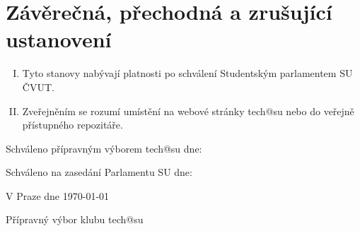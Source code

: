 \documentclass[10pt]{article}
\begin{document}
\section{Závěrečná, přechodná a zrušující ustanovení}
	\begin{enumerate}[I.]
	\item Tyto stanovy nabývají platnosti po schválení Studentským parlamentem SU ČVUT.
	\item Zveřejněním se rozumí umístění na webové stránky tech@su nebo do veřejně přístupného repozitáře.
	\end{enumerate}


\vspace{10mm}

Schváleno přípravným výborem tech@su dne:

Schváleno na zasedání Parlamentu SU dne:

\vspace{30mm}

\hfill V Praze dne \today

\hfill Přípravný výbor klubu tech@su
\end{document}
